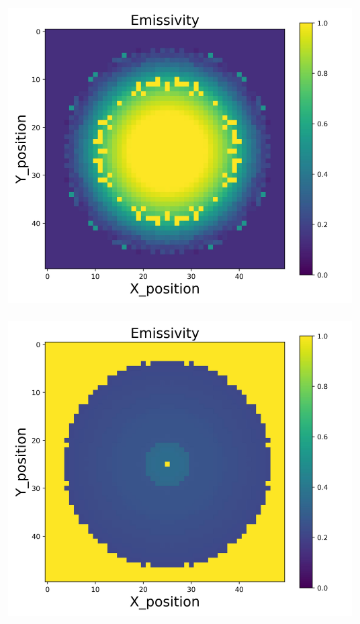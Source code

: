 \begin{figure}[p]
    \centering
    \begin{minipage}{\textwidth}
        \centering
        \begin{subfigure}{0.325\textwidth}
            \centering
            \includegraphics[width=\textwidth]{figures/raw_data/0/lin_square/emi_cal.jpg}
        \end{subfigure}
        \begin{subfigure}{0.325\textwidth}
            \centering
            \includegraphics[width=\textwidth]{figures/raw_data/5/lin_square/emi_cal.jpg}

\end{subfigure}
\end{minipage}
\end{figure}
